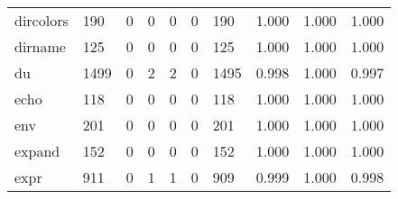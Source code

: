 \begin{longtable}{lp{2.0cm}p{2.0cm}p{2.0cm}p{2.0cm}p{2.0cm}p{2.0cm}p{2.0cm}p{2.0cm}p{2.0cm}}
dircolors &                    190 &                                  0 &                                 0 &                                0 &                                 0 &                             190 &                                   1.000 &                                  1.000 &                                1.000 \\
dirname   &                    125 &                                  0 &                                 0 &                                0 &                                 0 &                             125 &                                   1.000 &                                  1.000 &                                1.000 \\
du        &                   1499 &                                  0 &                                 2 &                                2 &                                 0 &                            1495 &                                   0.998 &                                  1.000 &                                0.997 \\
echo      &                    118 &                                  0 &                                 0 &                                0 &                                 0 &                             118 &                                   1.000 &                                  1.000 &                                1.000 \\
env       &                    201 &                                  0 &                                 0 &                                0 &                                 0 &                             201 &                                   1.000 &                                  1.000 &                                1.000 \\
expand    &                    152 &                                  0 &                                 0 &                                0 &                                 0 &                             152 &                                   1.000 &                                  1.000 &                                1.000 \\
expr      &                    911 &                                  0 &                                 1 &                                1 &                                 0 &                             909 &                                   0.999 &                                  1.000 &                                0.998 \\

\end{longtable}
